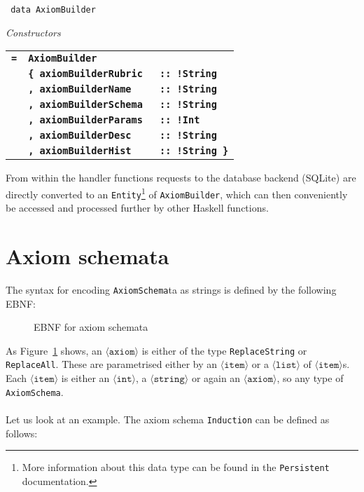 \documentclass[notitlepage]{report}
\newcommand\m[1]{\texttt{#1}}
\begin{document}
\newcommand{\htt}[1]{{\small\bfseries\texttt{#1}}}

\begin{haddockdesc}
\item[\texttt{
data AxiomBuilder
}]
{\haddockbegindoc
\enspace \emph{Constructors}\par
\begin{tabulary}{\linewidth}{@{}llJ@{}}
    \htt{=}  &   \htt{AxiomBuilder}         &                 \\
             &   \htt{\{  axiomBuilderRubric } &\htt{:: !String} \\
             &   \htt{,   axiomBuilderName   } &\htt{:: !String} \\
             &   \htt{,   axiomBuilderSchema } &\htt{:: !String} \\
             &   \htt{,   axiomBuilderParams } &\htt{:: !Int   } \\
             &   \htt{,   axiomBuilderDesc   } &\htt{:: !String} \\
             &   \htt{,   axiomBuilderHist   } &\htt{:: !String \}}
 \end{tabulary}}
\end{haddockdesc}

From within the handler functions requests to the database backend (SQLite) are
directly converted to an \m{Entity}\footnote{More information about this data
type can be found in the \texttt{Persistent} documentation.} of \m{AxiomBuilder},
which can then conveniently be accessed and processed further by other Haskell
functions.

\pagebreak
\section{Axiom schemata}\label{sec:axiom_schemata}

The syntax for encoding \m{AxiomSchema}ta as strings is defined by the following
EBNF:
\begin{figure}[h!]
    {\renewcommand{\arraystretch}{2.0}
    }
    \caption{EBNF for axiom schemata}\label{fig:EBNFaxiom}
\end{figure}

As Figure~\ref{fig:EBNFaxiom} shows, an $\langle \texttt{axiom} \rangle$ is either
of the type \m{ReplaceString} or \m{ReplaceAll}. These are parametrised either
by an $\langle \texttt{item} \rangle$ or a $\langle \texttt{list} \rangle$
of $\langle \texttt{item} \rangle$s. Each $\langle \texttt{item} \rangle$ is
either an $\langle \texttt{int} \rangle$, a $\langle \texttt{string} \rangle$
or again an $\langle \texttt{axiom} \rangle$, so any type of \m{AxiomSchema}.
\\\\
Let us look at an example. The axiom schema \texttt{Induction} can be defined as
follows:
\end{document}

